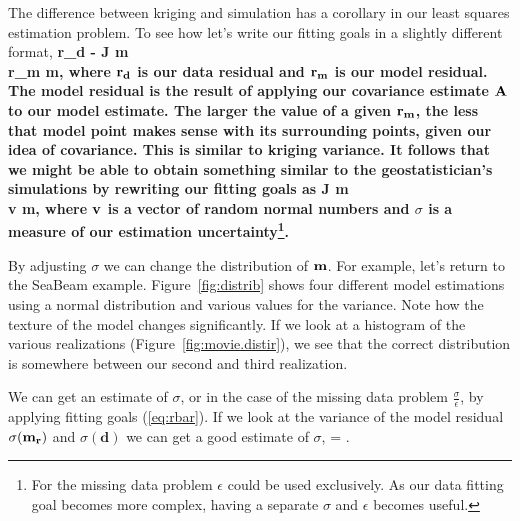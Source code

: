 %
%
%
%
%
%
%
%
The difference between kriging and simulation has a corollary in our
least squares estimation problem. To see how let's write
our fitting goals in a slightly different format,
\beqa
\bf r_d \pox {}  - \bf J  \bf m  \nonumber \\ 
\bf r_m \pox \epsilon \reg \bf m\label{eq:rbar},
\eeqa
where $\bf r_d$ is our data residual and $\bf r_m$ is our model
residual.  The model residual is the result of applying our
covariance estimate $\bf A$ to our model estimate.  The larger
the value of a given $\bf r_m$, the less that model point makes
sense with its surrounding points, given our idea of covariance.
This is similar to kriging variance.
It follows that we might be able to obtain something similar
to the geostatistician's simulations by rewriting our fitting
goals as 
\beqa
{} \pox  \bf J  \bf m  \nonumber \\ 
\sigma \bf  v \pox \epsilon \reg \bf m\label{eq:rand},
\eeqa
where $\bf v$ is a vector of random normal numbers and $\sigma$ is 
a measure of our estimation uncertainty\footnote{For the missing
data problem $\epsilon$ could be used exclusively.
As  our data fitting goal becomes more complex,
having a separate  $\sigma$ and $\epsilon$ becomes useful.}.

By adjusting $\sigma$
we can change the distribution of
$\bf m$. For example, let's return to the SeaBeam example.
Figure~\ref{fig:distrib} shows four different model estimations
using a normal distribution and various values for the variance.
Note how the texture of the model changes significantly. If we look
at a histogram of the various realizations (Figure~\ref{fig:movie.distir}),
we see that the correct
distribution is somewhere between our second and third realization.
\par 
We can get an estimate of $\sigma$, or in the case of the missing
data problem $\frac{\sigma}{\epsilon}$, by applying fitting goals 
(\ref{eq:rbar}). If we look at the variance of the model residual $\sigma(\bf m_r)$  and 
$\sigma(\mathbf{d})$ we can get a good estimate of $\sigma$,
\beq
\sigma =  \label{eq:sigma.calc} .
\eeq

%

